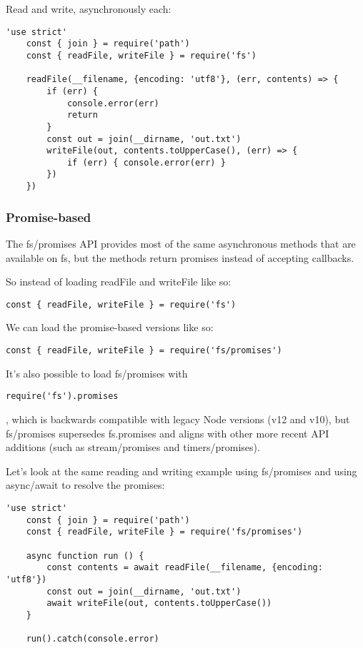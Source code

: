 \documentclass{scrartcl}
\begin{document}
Read and write, asynchronously each:

\begin{lstlisting}[style=ES6]
    'use strict'
    const { join } = require('path')
    const { readFile, writeFile } = require('fs')

    readFile(__filename, {encoding: 'utf8'}, (err, contents) => {
        if (err) {
            console.error(err)
            return
        }
        const out = join(__dirname, 'out.txt')
        writeFile(out, contents.toUpperCase(), (err) => {
            if (err) { console.error(err) }
        })
    })
\end{lstlisting}

\subsubsection{Promise-based}

The fs/promises API provides most of the same asynchronous methods that are available on fs, but the methods return promises instead of accepting callbacks.

So instead of loading readFile and writeFile like so:

\begin{lstlisting}[style=ES6]
    const { readFile, writeFile } = require('fs')
\end{lstlisting}

We can load the promise-based versions like so:

\begin{lstlisting}[style=ES6]
    const { readFile, writeFile } = require('fs/promises')
\end{lstlisting}

It's also possible to load fs/promises with

\begin{lstlisting}[style=ES6]
    require('fs').promises
\end{lstlisting}

, which is backwards compatible with legacy Node versions (v12 and v10), but fs/promises supersedes fs.promises and aligns with other more recent API additions (such as stream/promises and timers/promises).

Let's look at the same reading and writing example using fs/promises and using async/await to resolve the promises:

\begin{lstlisting}[style=ES6]
    'use strict'
    const { join } = require('path')
    const { readFile, writeFile } = require('fs/promises')

    async function run () {
        const contents = await readFile(__filename, {encoding: 'utf8'})
        const out = join(__dirname, 'out.txt')
        await writeFile(out, contents.toUpperCase())
    }

    run().catch(console.error)
\end{lstlisting}
\end{document}
